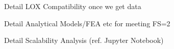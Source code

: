  
	Detail LOX Compatibility once we get data
	


Detail Analytical Models/FEA etc for meeting FS=2


Detail Scalability Analysis (ref. Jupyter Notebook)
	

\newpage